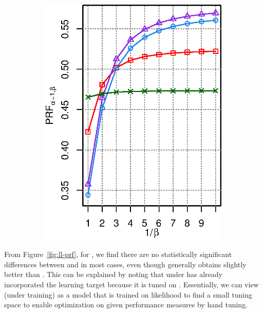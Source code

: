 \begin{figure}[H]
\begin{subfigure}[b]{0.45\columnwidth}
\caption{\QFI}
\end{subfigure}
\begin{subfigure}[b]{0.45\columnwidth}
\includegraphics[width=\columnwidth]{figure/qf13-qfj-prfaf-ll-prf.eps}
\caption{\QFJ}
\end{subfigure}
\end{figure}

From Figure~\ref{fig:ll-prf}, for \QFI, we find there are no statistically significant differences between \MLE and \EUM in most cases, even though generally \EUM obtains slightly better \PRF than \MLE. This can be explained by noting that \QFI under \MLE has already incorporated the \PRF learning target because it is tuned on \PRF. Essentially, we can view \QFI (under \MLE training) as a model that is trained on likelihood to find a small tuning space to enable optimization on given performance measures by hand tuning.

